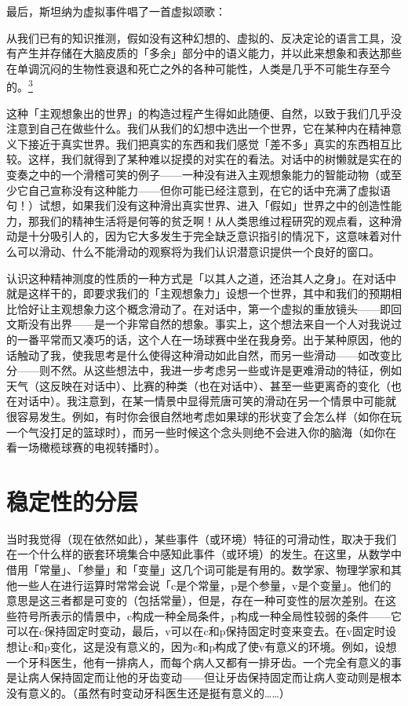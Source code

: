 \documentclass[
  12pt,
  twoside,
  openright,
  oldfontcommands,
]{memoir}
\newenvironment{fsquote}{%
  \begin{mdframed}[style=gebquote]\kaitifamily\small%
}{%
  \end{mdframed}%
}
\begin{document}
最后，斯坦纳为虚拟事件唱了一首虚拟颂歌：

\begin{fsquote}
从我们已有的知识推测，假如没有这种幻想的、虚拟的、反决定论的语言工具，没有产生并存储在大脑皮质的「多余」部分中的语义能力，并以此来想象和表达那些在单调沉闷的生物性衰退和死亡之外的各种可能性，人类是几乎不可能生存至今的。\hyperref[fn:Chapter19-3]{\textsuperscript{3}}
\end{fsquote}

这种「主观想象出的世界」的构造过程产生得如此随便、自然，以致于我们几乎没注意到自己在做些什么。我们从我们的幻想中选出一个世界，它在某种内在精神意义下接近于真实世界。我们把真实的东西和我们感觉「差不多」真实的东西相互比较。这样，我们就得到了某种难以捉摸的对实在的看法。对话中的树懒就是实在的变奏之中的一个滑稽可笑的例子------一种没有进入主观想象能力的智能动物（或至少它自己宣称没有这种能力------但你可能已经注意到，在它的话中充满了虚拟语句！）试想，如果我们没有这种滑出真实世界、进入「假如」世界之中的创造性能力，那我们的精神生活将是何等的贫乏啊！从人类思维过程研究的观点看，这种滑动是十分吸引人的，因为它大多发生于完全缺乏意识指引的情况下，这意味着对什么可以滑动、什么不能滑动的观察将为我们认识潜意识提供一个良好的窗口。

认识这种精神测度的性质的一种方式是「以其人之道，还治其人之身」。在对话中就是这样干的，即要求我们的「主观想象力」设想一个世界，其中和我们的预期相比恰好让主观想象力这个概念滑动了。在对话中，第一个虚拟的重放镜头------即回文斯没有出界------是一个非常自然的想象。事实上，这个想法来自一个人对我说过的一番平常而又凑巧的话，这个人在一场球赛中坐在我身旁。出于某种原因，他的话触动了我，使我思考是什么使得这种滑动如此自然，而另一些滑动------如改变比分------则不然。从这些想法中，我进一步考虑另一些或许是更难滑动的特征，例如天气（这反映在对话中）、比赛的种类（也在对话中）、甚至一些更离奇的变化（也在对话中）。我注意到，在某一情景中显得荒唐可笑的滑动在另一个情景中可能就很容易发生。例如，有时你会很自然地考虑如果球的形状变了会怎么样（如你在玩一个气没打足的篮球时），而另一些时候这个念头则绝不会进入你的脑海（如你在看一场橄榄球赛的电视转播时）。

\section{稳定性的分层}

当时我觉得（现在依然如此），某些事件（或环境）特征的可滑动性，取决于我们在一个什么样的嵌套环境集合中感知此事件（或环境）的发生。在这里，从数学中借用「常量」、「参量」和「变量」这几个词可能是有用的。数学家、物理学家和其他一些人在进行运算时常常会说「c是个常量，p是个参量，v是个变量」。他们的意思是这三者都是可变的（包括常量），但是，存在一种可变性的层次差别。在这些符号所表示的情景中，c构成一种全局条件，p构成一种全局性较弱的条件------它可以在c保持固定时变动，最后，v可以在c和p保持固定时变来变去。在v固定时设想让c和p变化，这是没有意义的，因为c和p构成了使v有意义的环境。例如，设想一个牙科医生，他有一排病人，而每个病人又都有一排牙齿。一个完全有意义的事是让病人保持固定而让他的牙齿变动------但让牙齿保持固定而让病人变动则是根本没有意义的。（虽然有时变动牙科医生还是挺有意义的\ldots\ldots）
\end{document}
